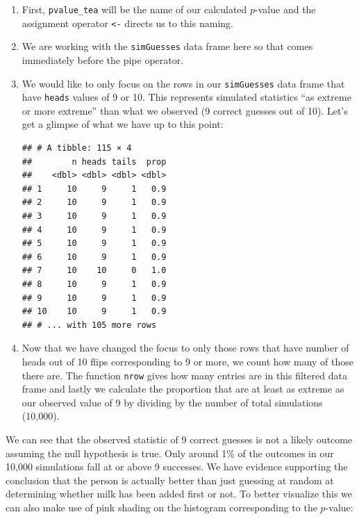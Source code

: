 \documentclass[]{tufte-book}
\newenvironment{Shaded}{\begin{snugshade}}{\end{snugshade}}
\newcommand{\KeywordTok}[1]{\textcolor[rgb]{0.13,0.29,0.53}{\textbf{{#1}}}}
\newcommand{\DecValTok}[1]{\textcolor[rgb]{0.00,0.00,0.81}{{#1}}}
\newcommand{\StringTok}[1]{\textcolor[rgb]{0.31,0.60,0.02}{{#1}}}
\newcommand{\NormalTok}[1]{{#1}}
\begin{document}
\begin{enumerate}
\def\labelenumi{\arabic{enumi}.}
\item
  First, \texttt{pvalue\_tea} will be the name of our calculated
  \(p\)-value and the assignment operator \texttt{\textless{}-} directs
  us to this naming.
\item
  We are working with the \texttt{simGuesses} data frame here so that
  comes immediately before the pipe operator.
\item
  We would like to only focus on the rows in our \texttt{simGuesses}
  data frame that have \texttt{heads} values of 9 or 10. This represents
  simulated statistics ``as extreme or more extreme'' than what we
  observed (9 correct guesses out of 10). Let's get a glimpse of what we
  have up to this point:

\begin{Shaded}
\end{Shaded}

\begin{verbatim}
## # A tibble: 115 × 4
##        n heads tails  prop
##    <dbl> <dbl> <dbl> <dbl>
## 1     10     9     1   0.9
## 2     10     9     1   0.9
## 3     10     9     1   0.9
## 4     10     9     1   0.9
## 5     10     9     1   0.9
## 6     10     9     1   0.9
## 7     10    10     0   1.0
## 8     10     9     1   0.9
## 9     10     9     1   0.9
## 10    10     9     1   0.9
## # ... with 105 more rows
\end{verbatim}
\item
  Now that we have changed the focus to only those rows that have number
  of heads out of 10 flips corresponding to 9 or more, we count how many
  of those there are. The function \texttt{nrow} gives how many entries
  are in this filtered data frame and lastly we calculate the proportion
  that are at least as extreme as our observed value of 9 by dividing by
  the number of total simulations (10,000).
\end{enumerate}

We can see that the observed statistic of 9 correct guesses is not a
likely outcome assuming the null hypothesis is true. Only around 1\% of
the outcomes in our 10,000 simulations fall at or above 9 successes. We
have evidence supporting the conclusion that the person is actually
better than just guessing at random at determining whether milk has been
added first or not. To better visualize this we can also make use of
pink shading on the histogram corresponding to the \(p\)-value:
\end{document}
